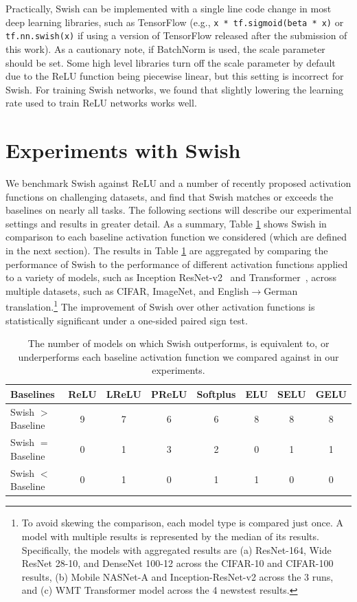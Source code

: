 \documentclass{article} %
\begin{document}
Practically, Swish can be implemented with a single line code change in most deep learning libraries, such as TensorFlow \citep{abadi2016tensorflow} (e.g., \texttt{x * tf.sigmoid(beta * x)} or \texttt{tf.nn.swish(x)} if using a version of TensorFlow released after the submission of this work). As a cautionary note, if BatchNorm \citep{ioffe2015batch} is used, the scale parameter should be set. Some high level libraries turn off the scale parameter by default due to the ReLU function being piecewise linear, but this setting is incorrect for Swish. For training Swish networks, we found that slightly lowering the learning rate used to train ReLU networks works well.

\section{Experiments with Swish}
\label{sec:experiments}

We benchmark Swish against ReLU and a number of recently proposed activation functions on challenging datasets, and find that Swish matches or exceeds the baselines on nearly all tasks. The following sections will describe our experimental settings and results in greater detail. As a summary, Table \ref{table:sign-test-summary} shows Swish in comparison to each baseline activation function we considered (which are defined in the next section). The results in Table \ref{table:sign-test-summary} are aggregated by comparing the performance of Swish to the performance of different activation functions applied to a variety of models, such as Inception ResNet-v2~\citep{szegedy2017inception} and Transformer~\citep{vaswani2017attention}, across multiple datasets, such as CIFAR, ImageNet, and English$\rightarrow$German translation.\footnote{To avoid skewing the comparison, each model type is compared just once. A model with multiple results is represented by the median of its results. Specifically, the models with aggregated results are (a) ResNet-164, Wide ResNet 28-10, and DenseNet 100-12 across the CIFAR-10 and CIFAR-100 results, (b) Mobile NASNet-A and Inception-ResNet-v2 across the 3 runs, and (c) WMT Transformer model across the 4 newstest results.} The improvement of Swish over other activation functions is statistically significant under a one-sided paired sign test. 

\begin{table}[h!]
\centering
\small
\begin{tabular}{lccccccc}
\toprule[0.25mm]
\bf{Baselines} & \bf{ReLU} & \bf{LReLU} & \bf{PReLU} & \bf{Softplus} & \bf{ELU} & \bf{SELU} & \bf{GELU}  \\
\midrule
Swish $>$ Baseline  & 9 & 7 & 6 & 6 & 8 & 8 & 8 \\
Swish $=$ Baseline  & 0 & 1 & 3 & 2 & 0 & 1 & 1\\
Swish $<$ Baseline  & 0 & 1 & 0 & 1 & 1 & 0 & 0\\
\bottomrule[0.25mm]
\end{tabular}
\caption{The number of models on which Swish outperforms, is equivalent to, or underperforms each baseline activation function we compared against in our experiments.}
\label{table:sign-test-summary}
\end{table}
\end{document}
